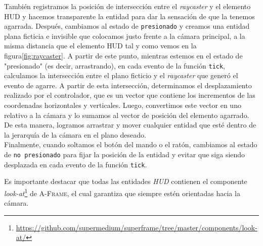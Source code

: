 \documentclass[a4paper, 11pt]{book}
\begin{document}
También registramos la posición de intersección entre el \emph{raycaster} y el elemento \textsc{HUD} y hacemos transparente la entidad para dar la sensación de que la tenemos agarrada. Después, cambiamos al estado de \texttt{presionado} y creamos una entidad plana ficticia e invisible que colocamos justo frente a la cámara principal, a la misma distancia que el elemento \textsc{HUD} tal y como vemos en la figura\ref{fig:raycaster}. A partir de este punto, mientras estemos en el estado de "presionado" (es decir, arrastrando), en cada evento de la función \texttt{tick}, calculamos la intersección entre el plano ficticio y el \emph{raycaster} que generó el evento de agarre. A partir de esta intersección, determinamos el desplazamiento realizado por el controlador, que es un vector que contiene los incrementos de las coordenadas horizontales y verticales. Luego, convertimos este vector en uno relativo a la cámara y lo sumamos al vector de posición del elemento agarrado. De esta manera, logramos arrastrar y mover cualquier entidad que esté dentro de la jerarquía de la cámara en el plano deseado.\\
Finalmente, cuando soltamos el botón del mando o el ratón, cambiamos al estado de  \texttt{no presionado} para fijar la posición de la entidad y evitar que siga siendo desplazada en cada evento de la función \texttt{tick}.

Es importante destacar que todas las entidades \emph{HUD} contienen el componente \emph{look-at}\footnote{\url{https://github.com/supermedium/superframe/tree/master/components/look-at/}} de \textsc{A-Frame}, el cual garantiza que siempre estén orientadas hacia la cámara.
\end{document}
